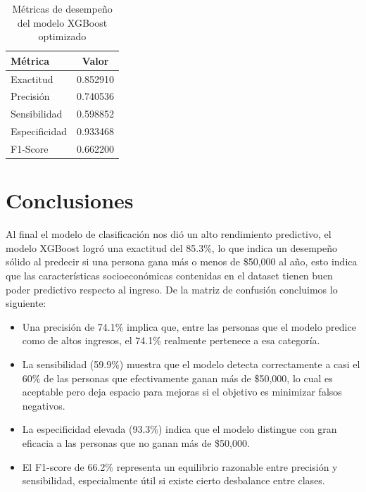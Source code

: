 \documentclass{article}
\begin{document}
	
	\begin{table}[ht]
		\centering
		\begin{tabular}{|l|c|}
			\hline
			\textbf{Métrica} & \textbf{Valor} \\
			\hline
			Exactitud     & 0.852910 \\
			Precisión     & 0.740536 \\
			Sensibilidad  & 0.598852 \\
			Especificidad & 0.933468 \\
			F1-Score      & 0.662200 \\
			\hline
		\end{tabular}
		\caption{Métricas de desempeño del modelo XGBoost optimizado}
		\label{tab:metricas_xgboost}
	\end{table}
	
	
	\section{Conclusiones}
	
	Al final el modelo de clasificación nos dió un alto rendimiento predictivo, el modelo XGBoost logró una exactitud del 85.3\%, lo que indica un desempeño sólido al predecir si una persona gana más o menos de \$50,000 al año, esto indica que las características socioeconómicas contenidas en el dataset tienen buen poder predictivo respecto al ingreso. De la matriz de confusión concluimos lo siguiente:
	
	\begin{itemize}
		\item Una precisión de 74.1\% implica que, entre las personas que el modelo predice como de altos ingresos, el 74.1\% realmente pertenece a esa categoría.
		
		\item La sensibilidad (59.9\%) muestra que el modelo detecta correctamente a casi el 60\% de las personas que efectivamente ganan más de \$50,000, lo cual es aceptable pero deja espacio para mejoras si el objetivo es minimizar falsos negativos.
		
		\item La especificidad elevada (93.3\%) indica que el modelo distingue con gran eficacia a las personas que no ganan más de \$50,000.
		
		\item El F1-score de 66.2\% representa un equilibrio razonable entre precisión y sensibilidad, especialmente útil si existe cierto desbalance entre clases.
		
	\end{itemize}
	
\end{document}
